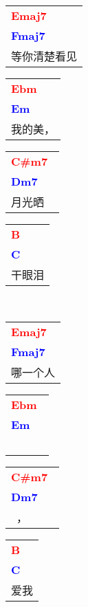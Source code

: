\documentclass[12pt,a4paper,openany,UTF8]{memoir}
\begin{document}
\begin{tabular}[b]{l}
    \textbf{\textcolor{red}{Emaj7\ }}\\\textbf{\textcolor{blue}{Fmaj7\ }}\\
    等你清楚看见\mbox{}\end{tabular}\begin{tabular}[b]{l}
    \textbf{\textcolor{red}{Ebm\ }}\\\textbf{\textcolor{blue}{Em\ }}\\
    我的美，\mbox{}\end{tabular}\begin{tabular}[b]{l}
    \textbf{\textcolor{red}{C\#m7\ }}\\\textbf{\textcolor{blue}{Dm7\ }}\\
    月光晒\mbox{}\end{tabular}\begin{tabular}[b]{l}
    \textbf{\textcolor{red}{B\ }}\\\textbf{\textcolor{blue}{C\ }}\\
    干眼泪\mbox{}\end{tabular}\\
\begin{tabular}[b]{l}
    \textbf{\textcolor{red}{Emaj7\ }}\\\textbf{\textcolor{blue}{Fmaj7\ }}\\
    哪一个人\mbox{}\end{tabular}\begin{tabular}[b]{l}
    \textbf{\textcolor{red}{Ebm\ }}\\\textbf{\textcolor{blue}{Em\ }}\\
    ~\mbox{}\end{tabular}\begin{tabular}[b]{l}
    \textbf{\textcolor{red}{C\#m7\ }}\\\textbf{\textcolor{blue}{Dm7\ }}\\
    ~，\mbox{}\end{tabular}\begin{tabular}[b]{l}
    \textbf{\textcolor{red}{B\ }}\\\textbf{\textcolor{blue}{C\ }}\\
    爱我\mbox{}\end{tabular}\\
\end{document}

